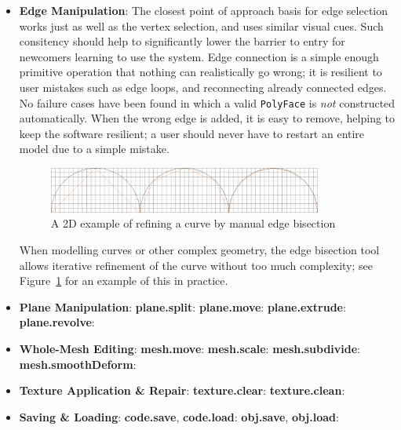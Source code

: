 \documentclass[a4paper,10pt]{article}
\begin{document}
\begin{itemize}
\item{\textbf{Edge Manipulation}: The closest point of approach basis for edge selection works just as well as the vertex selection, and uses similar visual cues. Such consitency should help to significantly lower the barrier to entry for newcomers learning to use the system. Edge connection is a simple enough primitive operation that nothing can realistically go wrong; it is resilient to user mistakes such as edge loops, and reconnecting already connected edges. No failure cases have been found in which a valid \texttt{PolyFace} is \textit{not} constructed automatically. When the wrong edge is added, it is easy to remove, helping to keep the software resilient; a user should never have to restart an entire model due to a simple mistake.

\begin{figure}
  \begin{center}
    \includegraphics[width=340px]{EdgeRefinement}
  \end{center}
  \caption{A 2D example of refining a curve by manual edge bisection}
  \label{refine}
\end{figure} 

When modelling curves or other complex geometry, the edge bisection tool allows iterative refinement of the curve without too much complexity; see Figure~\ref{refine} for an example of this in practice.}

\item{\textbf{Plane Manipulation}:
\textbf{plane.split}:
\textbf{plane.move}:
\textbf{plane.extrude}:
\textbf{plane.revolve}: }

\item{\textbf{Whole-Mesh Editing}:
\textbf{mesh.move}:
\textbf{mesh.scale}:
\textbf{mesh.subdivide}:
\textbf{mesh.smoothDeform}: }

\item{\textbf{Texture Application \& Repair}:
\textbf{texture.clear}:
\textbf{texture.clean}: }

\item{\textbf{Saving \& Loading}:
\textbf{code.save}, \textbf{code.load}:
\textbf{obj.save}, \textbf{obj.load}: }
\end{itemize}
\end{document}
